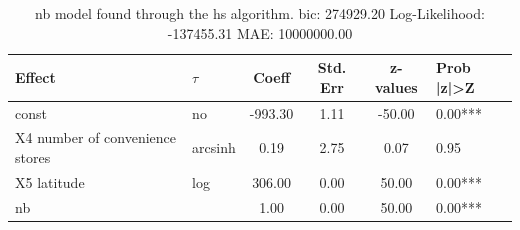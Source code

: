 \begin{table}
	\caption{nb model found through the hs algorithm. bic: 274929.20 Log-Likelihood: -137455.31 MAE: 10000000.00}
	\begin{center}
		\begin{tabular}{|l|l|c|c|c|l|}
			\hline
			Effect & $\tau$ & Coeff & Std. Err & z-values & Prob |z|>Z \\
			\hline
			const & no & -993.30 & 1.11 & -50.00 & 0.00*** \\
			\hline
			X4 number of convenience stores & arcsinh & 0.19 & 2.75 & 0.07 & 0.95 \\
			\hline
			X5 latitude & log & 306.00 & 0.00 & 50.00 & 0.00*** \\
			\hline
			nb &  & 1.00 & 0.00 & 50.00 & 0.00*** \\
			\hline
		\end{tabular}
	\end{center}
\end{table}
